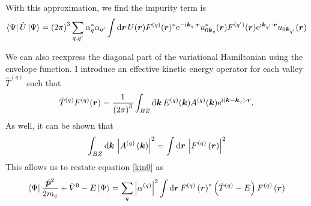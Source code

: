 With this approximation, we find the impurity term is
\begin{equation}
  \textstyle \left\langle \Psi \right| \displaystyle\hat{U}\textstyle \left| \Psi \right\rangle \displaystyle 
  = 
  \left(2\pi\right)^3
  \sum_{q,q^\prime}
  \alpha_{q}^*\alpha_{q^\prime}
  \int \mathrm{d}\bm{r}\, U(\bm{r})
  F^{(q)}(\bm{r})^{*}
  \mathrm{e}^{-\mathrm{i}\bm{k}_{q}\cdot\bm{r}}
  u^{*}_{0\bm{k}_{q}}(\bm{r})
  F^{(q^\prime)}(\bm{r})
  \mathrm{e}^{\mathrm{i}\bm{k}_{q^\prime}\cdot\bm{r}}
  u_{0\bm{k}_{q^\prime}}(\bm{r})
  \label{pot}
\end{equation}

We can also reexpress the diagonal part of the variational Hamiltonian
using the envelope function. I introduce an effective kinetic energy
operator for each valley $\hat{T}^{(q)}$ such that
\begin{equation}
  \hat{T}^{(q)} F^{(q)}(\bm{r})
  =
  \frac{1}{\left(2\pi\right)^3}
  \int_{BZ}\mathrm{d}\bm{k}\, 
  E^{(q)}(\bm{k})A^{(q)}(\bm{k})
  \mathrm{e}^{\mathrm{i}\left(\bm{k} - \bm{k}_{q}\right)\cdot\bm{r}}.
\label{tdef}
\end{equation}
As well, it can be shown that 
\begin{equation}
  \int_{BZ}\mathrm{d}\bm{k}\,
  \left|A^{(q)}\left(\bm{k}\right)\right|^2
  = 
  \int\mathrm{d}\bm{r}\,
  \left|F^{(q)}\left(\bm{r}\right)\right|^2
  \label{sdef}
\end{equation}
This allows us to restate equation \eqref{kin0} as
\begin{equation}
  \textstyle \left\langle \Psi \right| \displaystyle\frac{\hat{\bm{p}}^2}{2 m_e} + \hat{V}^0 - E\textstyle \left| \Psi \right\rangle \displaystyle =
  \sum_{q}\left|\alpha^{(q)}\right|^2
  \int\mathrm{d}\bm{r}\,
  F^{(q)}\left(\bm{r}\right)^{*}
  \left(\hat{T}^{(q)}-E\right)
  F^{(q)}\left(\bm{r}\right)
  \label{kin1}
\end{equation}

